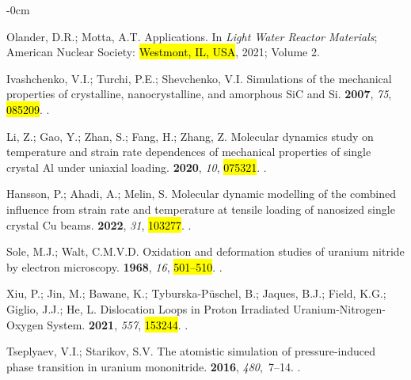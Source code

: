 \documentclass[applsci,article,accept,pdftex,moreauthors]{Definitions/mdpi}
\newcommand{\?}{\stackrel{?}{=}}
\begin{document}
\begin{adjustwidth}{-\extralength}{0cm}
\begin{thebibliography}{999}
Olander, D.R.; Motta, A.T.
\newblock Applications. In {\em Light Water Reactor Materials}; American
  Nuclear Society: \hl{Westmont, IL, USA}, 2021; Volume 2.

Ivashchenko, V.I.; Turchi, P.E.; Shevchenko, V.I.
\newblock Simulations of the mechanical properties of crystalline,
  nanocrystalline, and amorphous {SiC} and {Si}.
 {\bf
  2007}, {\em 75}, \hl{085209}.
.

Li, Z.; Gao, Y.; Zhan, S.; Fang, H.; Zhang, Z.
\newblock Molecular dynamics study on temperature and strain rate dependences
  of mechanical properties of single crystal {Al} under uniaxial loading.
 {\bf 2020}, {\em 10}, \hl{075321}.
.

Hansson, P.; Ahadi, A.; Melin, S.
\newblock Molecular dynamic modelling of the combined influence from strain
  rate and temperature at tensile loading of nanosized single crystal {Cu}
  beams.
 {\bf 2022}, {\em 31}, \hl{103277}.
.

Sole, M.J.; Walt, C.M.V.D.
\newblock Oxidation and deformation studies of uranium nitride by electron
  microscopy.
 {\bf 1968}, {\em 16}, \hl{501--510}.
.

Xiu, P.; Jin, M.; Bawane, K.; Tyburska-Püschel, B.; Jaques, B.J.; Field, K.G.;
  Giglio, J.J.; He, L.
\newblock Dislocation Loops in Proton Irradiated Uranium-Nitrogen-Oxygen
  System.
 {\bf 2021}, {\em 557}, \hl{153244}.
.

Tseplyaev, V.I.; Starikov, S.V.
\newblock The atomistic simulation of pressure-induced phase transition in
  uranium mononitride.
 {\bf 2016}, {\em 480},~7--14.
.


\end{thebibliography}
\end{adjustwidth}
\end{document}
